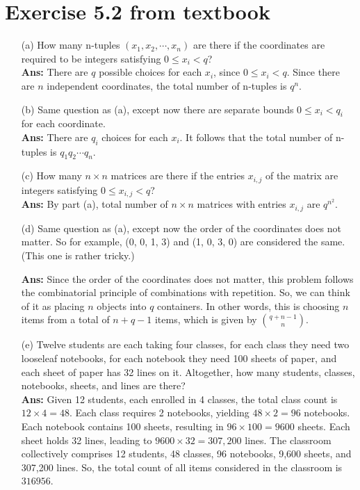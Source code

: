 \documentclass[12pt]{ut-thesis}
\theoremstyle{definition}
\begin{document}
	\section*{Exercise 5.2 from textbook}
	\begin{itemize}
		\item[(a)] How many n-tuples $(x_1, x_2, \cdots , x_n)$ are there if the coordinates are required
		to be integers satisfying $0 \le x_i < q$?\\
		\textbf{Ans:} There are $q$ possible choices for each $x_i$, since \( 0 \leq x_i < q \). 
		Since there are $n$ independent coordinates, the total number of n-tuples is $q^n$.

		\item[(b)] Same question as (a), except now there are separate bounds $0 \le x_i < q_i$ for
		each coordinate.\\
		\textbf{Ans:} There are $q_i$ choices for each $x_i$. It follows that the total number of 
		n-tuples is $q_1 q_2\cdots q_n$.

		\item[(c)] How many $n\times n$ matrices are there if the entries $x_{i,j}$ of the matrix are integers
		satisfying $0 \le x_{i,j} < q$?\\
		\textbf{Ans:} By part (a), total number of $n \times n$ matrices with entries $x_{i,j}$ are $q^{n^2}$.

		\item[(d)] Same question as (a), except now the order of the coordinates does not matter.
		So for example, (0, 0, 1, 3) and (1, 0, 3, 0) are considered the same. (This one is
		rather tricky.)

		\textbf{Ans:} Since the order of the coordinates does not matter, this problem follows the combinatorial 
		principle of combinations with repetition. So, we can think of it as placing $n$ objects into $q$ containers.
		In other words, this is choosing $n$ items from a total of $n+q-1$ items, which is
		given by $\binom{q + n - 1}{n}$.

		\item[(e)] Twelve students are each taking four classes, for each class they need two looseleaf
		notebooks, for each notebook they need 100 sheets of paper, and each sheet
		of paper has 32 lines on it. Altogether, how many students, classes, notebooks,
		sheets, and lines are there?\\
		\textbf{Ans:}
		Given 12 students, each enrolled in 4 classes, the total class count is $12 \times 4 = 48$. 
		Each class requires 2 notebooks, yielding $48 \times 2 = 96$ notebooks. 
		Each notebook contains 100 sheets, resulting in  $96 \times 100 = 9600$  sheets.
		Each sheet holds 32 lines, leading to $9600 \times 32 = 307,200$ lines.
		The classroom collectively comprises 12 students, 48 classes, 96 notebooks, 9,600 sheets, and 307,200 lines.
		So, the total count of all items considered in the classroom is $316956$.
	\end{itemize}
\end{document}
